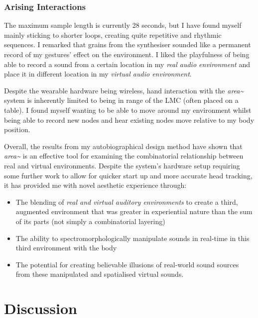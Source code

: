\subsubsection{Arising Interactions}            \label{sec: area-study-results-arisingints}
The maximum sample length is currently 28 seconds, but I have found myself mainly sticking to shorter loops, creating quite repetitive and rhythmic sequences. I remarked that grains from the synthesiser sounded like a permanent record of my gestures’ effect on the environment. I liked the playfulness of being able to record a sound from a certain location in my \textit{real audio environment} and place it in different location in my \textit{virtual audio environment}.

Despite the wearable hardware being wireless, hand interaction with the \textit{area\textasciitilde{}} system is inherently limited to being in range of the LMC (often placed on a table). I found myself wanting to be able to move around my environment whilst being able to record new nodes and hear existing nodes move relative to my body position.

Overall, the results from my autobiographical design method have shown that \textit{area\textasciitilde{}} is an effective tool for examining the combinatorial relationship between real and virtual environments. Despite the system’s hardware setup requiring some further work to allow for quicker start up and more accurate head tracking, it has provided me with novel aesthetic experience through:
\begin{itemize}
    \item The blending of \textit{real and virtual auditory environments} to create a third, augmented environment that was greater in experiential nature than the sum of its parts (not simply a combinatorial layering)
    \item The ability to spectromorphologically manipulate sounds in real-time in this third environment with the body
    \item The potential for creating believable illusions of real-world sound sources from these manipulated and spatialised virtual sounds.
\end{itemize}

\section{Discussion}                            \label{sec: area-discussion}
